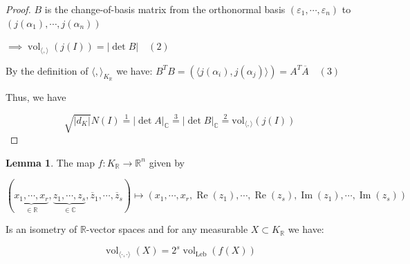 \documentclass[openany]{amsbook}
\numberwithin{section}{chapter}
\theoremstyle{definition}
\newtheorem{lemma}[theorem]{Lemma}
\begin{document}
\begin{proof}
    \(B\) is the change-of-basis matrix from the orthonormal basis \((\varepsilon_1, \cdots , \varepsilon_n)\) to  \((j(\alpha_1), \cdots , j(\alpha_n))\)
    
    \(\implies \operatorname{vol}_{\langle , \rangle }(j(I)) = \vert \det B \vert \quad (2)\) 
    
    By the definition of \(\langle , \rangle_{K_\mathbb{R}}\) we have: \(B^T B = (\langle j(\alpha_i),j(\alpha_j)\rangle ) = A^T \overline{A} \quad (3)\) 

    Thus, we have

    \[
        \sqrt{\vert d_K \vert} N(I) \overset{1}{=} \vert \det A \vert_\mathbb{C} \overset{3}{=} \vert \det B \vert_\mathbb{C} \overset{2}{=} \operatorname{vol_{\langle , \rangle}} (j(I)) 
    \]

\end{proof}

\begin{lemma}
    The map \(f : K_\mathbb{R} \to \mathbb{R}^n\) given by

    \[
        (\underbrace{x_1, \cdots , x_r}_{\in\mathbb{R}}, \underbrace{z_1, \cdots , z_s}_{\in\mathbb{C}}, \overline{z}_1, \cdots , \overline{z}_s) \mapsto (x_1, \cdots , x_r, \operatorname{Re}(z_1), \cdots , \operatorname{Re}(z_s), \operatorname{Im}(z_1), \cdots , \operatorname{Im}(z_s))
    \]

    Is an isometry of \(\mathbb{R}\)-vector spaces and for any measurable \(X \subset K_\mathbb{R}\) we have:

    \[
        \operatorname{vol}_{\langle \cdot, \cdot \rangle} (X) = 2^s \operatorname{vol}_{\operatorname{Leb}}(f(X))
    \]

\end{lemma}
\end{document}
